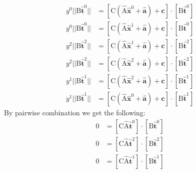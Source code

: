 \documentclass{scrartcl}
\begin{document}
\begin{subequations}
  \begin{align}
    y^0||\mathrm B\mathbf{\hat t}^0||
    &=\left[\mathrm C(\mathrm{\hat A}\mathbf{\hat x}^0
              +\mathbf{\hat a})+\mathbf c\right]
      \cdot[\mathrm B\mathbf{\hat t}^0]\\
    y^0||\mathrm B\mathbf{\hat t}^0||
    &=\left[\mathrm C(\mathrm{\hat A}\mathbf{\hat x}^1
              +\mathbf{\hat a})+\mathbf c\right]
      \cdot[\mathrm B\mathbf{\hat t}^0]\\
    y^2||\mathrm B\mathbf{\hat t}^2||
    &=\left[\mathrm C(\mathrm{\hat A}\mathbf{\hat x}^1
              +\mathbf{\hat a})+\mathbf c\right]
      \cdot[\mathrm B\mathbf{\hat t}^2]\\
    y^2||\mathrm B\mathbf{\hat t}^2||
    &=\left[\mathrm C(\mathrm{\hat A}\mathbf{\hat x}^2
              +\mathbf{\hat a})+\mathbf c\right]
      \cdot[\mathrm B\mathbf{\hat t}^2]\\
    y^1||\mathrm B\mathbf{\hat t}^1||
    &=\left[\mathrm C(\mathrm{\hat A}\mathbf{\hat x}^2
              +\mathbf{\hat a})+\mathbf c\right]
      \cdot[\mathrm B\mathbf{\hat t}^1]\\
    y^1||\mathrm B\mathbf{\hat t}^1||
    &=\left[\mathrm C(\mathrm{\hat A}\mathbf{\hat x}^0
              +\mathbf{\hat a})+\mathbf c\right]
      \cdot[\mathrm B\mathbf{\hat t}^1]
  \end{align}
\end{subequations}
By pairwise combination we get the following:
\begin{subequations}
  \begin{align}
    0&=[\mathrm C\mathrm{\hat A}\mathbf{\hat t}^0]
      \cdot[\mathrm B\mathbf{\hat t}^0]\\
    0&=[\mathrm C\mathrm{\hat A}\mathbf{\hat t}^2]
      \cdot[\mathrm B\mathbf{\hat t}^2]\\
    0&=[\mathrm C\mathrm{\hat A}\mathbf{\hat t}^1]
      \cdot[\mathrm B\mathbf{\hat t}^1]
  \end{align}
\end{subequations}
\end{document}
